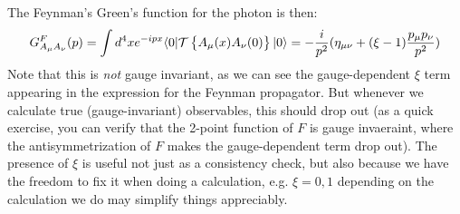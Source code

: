 The Feynman's Green's function for the photon is then:
\begin{equation}
    G^F_{A_\mu A_\nu}(p) = \int d^4x e^{-ipx}\langle 0 \rvert\mathcal{T}\set{A_\mu(x) A_\nu(0)}\lvert 0 \rangle = -\frac{i}{p^2}(\eta_{\mu\nu} + (\xi - 1)\frac{p_\mu p_\nu}{p^2})
\end{equation}
Note that this is \emph{not} gauge invariant, as we can see the gauge-dependent $\xi$ term appearing in the expression for the Feynman propagator. But whenever we calculate true (gauge-invariant) observables, this should drop out (as a quick exercise, you can verify that the 2-point function of $F$ is gauge invaeraint, where the antisymmetrization of $F$ makes the gauge-dependent term drop out). The presence of $\xi$ is useful not just as a consistency check, but also because we have the freedom to fix it when doing a calculation, e.g. $\xi = 0, 1$ depending on the calculation we do may simplify things appreciably.

